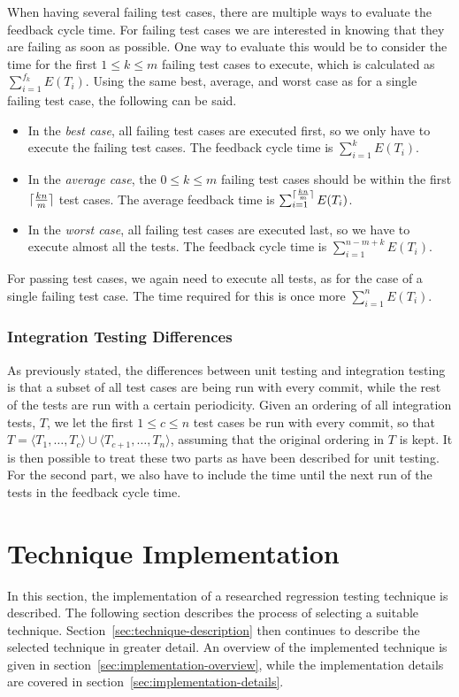 \documentclass[a4paper,english,12pt]{report}
\DeclarePairedDelimiter{\ceil}{\lceil}{\rceil}
\begin{document}
When having several failing test cases, there are multiple ways to evaluate the feedback cycle time. For failing test cases we are interested in knowing that they are failing as soon as possible. One way to evaluate this would be to consider the time for the first $1 \leq k \leq m$ failing test cases to execute, which is calculated as $\sum_{i=1}^{f_k} E(T_i)$. Using the same best, average, and worst case as for a single failing test case, the following can be said.

\begin{itemize}
  \item In the \textit{best case}, all failing test cases are executed first, so we only have to execute the failing test cases. The feedback cycle time is $\sum_{i=1}^{k}E(T_i)$. 
  \item In the \textit{average case}, the $0 \leq k \leq m$ failing test cases should be within the first $\ceil{\frac{kn}{m}}$ test cases. The average feedback time is $\sum_{i=1}^{\ceil{\frac{kn}{m}}}E(T_i)$.
  \item In the \textit{worst case}, all failing test cases are executed last, so we have to execute almost all the tests. The feedback cycle time is $\sum_{i=1}^{n-m+k} E(T_i)$.
\end{itemize}

For passing test cases, we again need to execute all tests, as for the case of a single failing test case. The time required for this is once more $\sum_{i=1}^{n}E(T_i)$.

\subsubsection{Integration Testing Differences}
As previously stated, the differences between unit testing and integration testing is that a subset of all test cases are being run with every commit, while the rest of the tests are run with a certain periodicity. Given an ordering of all integration tests, $T$, we let the first $1 \leq c \leq n$ test cases be run with every commit, so that $T=\langle T_1, \ldots, T_c \rangle\cup\langle T_{c+1},\ldots,T_{n} \rangle$, assuming that the original ordering in $T$ is kept. It is then possible to treat these two parts as have been described for unit testing. For the second part, we also have to include the time until the next run of the tests in the feedback cycle time.

\section{Technique Implementation}\label{sec:technique-implementation}
In this section, the implementation of a researched regression testing technique is described. The following section describes the process of selecting a suitable technique. Section~\ref{sec:technique-description} then continues to describe the selected technique in greater detail. An overview of the implemented technique is given in section~\ref{sec:implementation-overview}, while the implementation details are covered in section~\ref{sec:implementation-details}.
\end{document}
